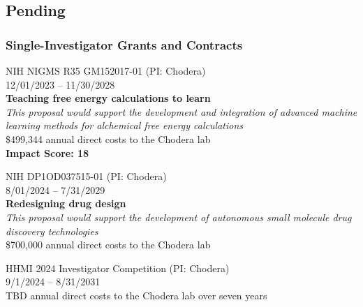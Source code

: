 \documentclass[10pt]{article}
\begin{document}
\eject
\subsection*{Pending}

\subsubsection*{Single-Investigator Grants and Contracts}

NIH NIGMS R35 GM152017-01 (PI: Chodera)\\
12/01/2023 -- 11/30/2028\\
{\bf Teaching free energy calculations to learn}\\
\emph{This proposal would support the development and integration of advanced machine learning methods for alchemical free energy calculations}\\
\$499,344 annual direct costs to the Chodera lab\\
{\bf Impact Score: 18}

\vspace{1.5ex}

NIH DP1OD037515-01  (PI: Chodera)\\
8/01/2024 -- 7/31/2029\\
{\bf Redesigning drug design}\\
\emph{This proposal would support the development of autonomous small molecule drug discovery technologies}\\
\$700,000 annual direct costs to the Chodera lab

\vspace{1.5ex}

HHMI 2024 Investigator Competition (PI: Chodera)\\
9/1/2024 -- 8/31/2031\\
TBD annual direct costs to the Chodera lab over seven years


%
%
%
\end{document}
